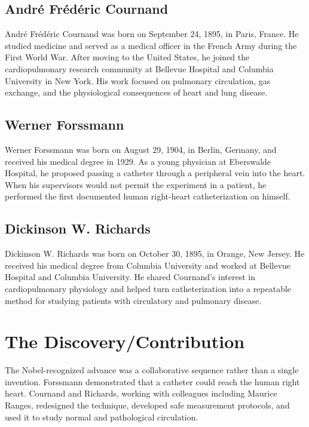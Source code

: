 \subsection{Andr\'e Fr\'ed\'eric Cournand}

Andr\'e Fr\'ed\'eric Cournand was born on September 24, 1895, in Paris, France. He studied medicine and served as a medical officer in the French Army during the First World War. After moving to the United States, he joined the cardiopulmonary research community at Bellevue Hospital and Columbia University in New York. His work focused on pulmonary circulation, gas exchange, and the physiological consequences of heart and lung disease.

\subsection{Werner Forssmann}

Werner Forssmann was born on August 29, 1904, in Berlin, Germany, and received his medical degree in 1929. As a young physician at Eberswalde Hospital, he proposed passing a catheter through a peripheral vein into the heart. When his supervisors would not permit the experiment in a patient, he performed the first documented human right-heart catheterization on himself.

\subsection{Dickinson W. Richards}

Dickinson W. Richards was born on October 30, 1895, in Orange, New Jersey. He received his medical degree from Columbia University and worked at Bellevue Hospital and Columbia University. He shared Cournand's interest in cardiopulmonary physiology and helped turn catheterization into a repeatable method for studying patients with circulatory and pulmonary disease.

\section{The Discovery/Contribution}

The Nobel-recognized advance was a collaborative sequence rather than a single invention. Forssmann demonstrated that a catheter could reach the human right heart. Cournand and Richards, working with colleagues including Maurice Ranges, redesigned the technique, developed safe measurement protocols, and used it to study normal and pathological circulation.

